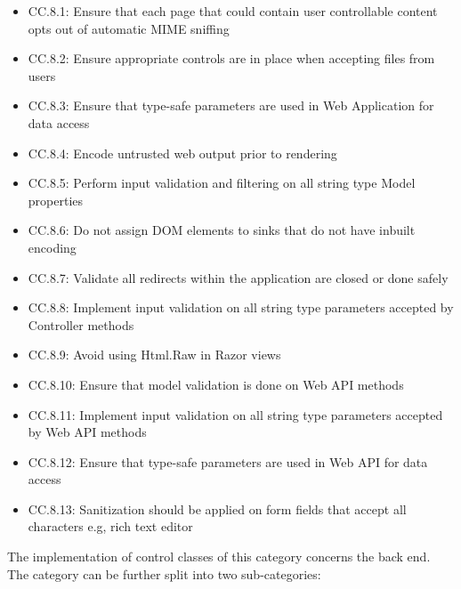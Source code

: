 \begin{itemize}
    \item CC.8.1: Ensure that each page that could contain user controllable content opts out of automatic MIME sniffing
    \item CC.8.2: Ensure appropriate controls are in place when accepting files from users
    \item CC.8.3: Ensure that type-safe parameters are used in Web Application for data access
    \item CC.8.4: Encode untrusted web output prior to rendering
    \item CC.8.5: Perform input validation and filtering on all string type Model properties
    \item CC.8.6: Do not assign DOM elements to sinks that do not have inbuilt encoding
    \item CC.8.7: Validate all redirects within the application are closed or done safely
    \item CC.8.8: Implement input validation on all string type parameters accepted by Controller methods
    \item CC.8.9: Avoid using Html.Raw in Razor views
    \item CC.8.10: Ensure that model validation is done on Web API methods
    \item CC.8.11: Implement input validation on all string type parameters accepted by Web API methods
    \item CC.8.12: Ensure that type-safe parameters are used in Web API for data access
    \item CC.8.13: Sanitization should be applied on form fields that accept all characters e.g, rich text editor
\end{itemize}

The implementation of control classes of this category concerns the back end. The category can be further split into two sub-categories:
